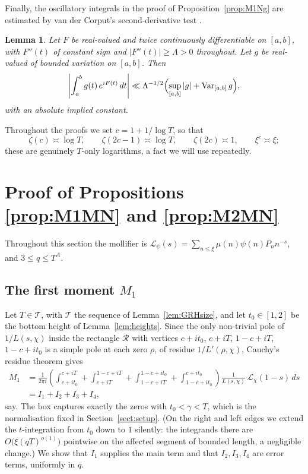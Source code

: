 \documentclass[10pt,a4paper]{amsart}
\newtheorem{lemma}[theorem]{Lemma}
\numberwithin{equation}{section}
\begin{document}
Finally, the oscillatory integrals in the proof of Proposition~\ref{prop:M1Ng} are estimated by van der Corput's second-derivative test \cite[Lemma~4.5]{Titchmarsh}.

\begin{lemma}\label{lem:vdc}
Let $F$ be real-valued and twice continuously differentiable on $[a,b]$, with $F''(t)$ of constant sign and $|F''(t)|\ge\Lambda>0$ throughout. Let $g$ be real-valued of bounded variation on $[a,b]$. Then
\[
\left|\int_a^b g(t)\,e^{iF(t)}\,dt\right|\ll\Lambda^{-1/2}\Bigl(\sup_{[a,b]}|g|+\operatorname{Var}_{[a,b]}g\Bigr),
\]
with an absolute implied constant.
\end{lemma}

Throughout the proofs we set $c=1+1/\log T$, so that
\[
\zeta(c)\asymp\log T,\qquad \zeta(2c-1)\asymp\log T,\qquad \zeta(2c)\asymp1,\qquad \xi^{c}\asymp\xi;
\]
these are genuinely $T$-only logarithms, a fact we will use repeatedly.

\section{Proof of Propositions \ref{prop:M1MN} and \ref{prop:M2MN}}\label{sect:propsMN}

Throughout this section the mollifier is $\mathcal{L}_\psi(s)=\sum_{n\le\xi}\mu(n)\psi(n)P_n n^{-s}$, and $3\le q\le T^{A}$.

\subsection{The first moment $M_1$}
Let $T\in\mathcal T$, with $\mathcal T$ the sequence of Lemma~\ref{lem:GRHsize}, and let $t_0\in[1,2]$ be the bottom height of Lemma~\ref{lem:heights}. Since the only non-trivial pole of $1/L(s,\chi)$ inside the rectangle $\mathcal R$ with vertices $c+it_0$, $c+iT$, $1-c+iT$, $1-c+it_0$ is a simple pole at each zero $\rho$, of residue $1/L'(\rho,\chi)$, Cauchy's residue theorem gives
\[
\begin{aligned}
M_1&=\frac{1}{2\pi i}\left(\int_{c+it_0}^{c+iT}+\int_{c+iT}^{1-c+iT}+\int_{1-c+iT}^{1-c+it_0}+\int_{1-c+it_0}^{c+it_0}\right)\frac{1}{L(s,\chi)}\,\mathcal{L}_{\bar\chi}(1-s)\,ds\\
&=I_1+I_2+I_3+I_4,
\end{aligned}
\]
say. The box captures exactly the zeros with $t_0<\gamma<T$, which is the normalisation fixed in Section~\ref{sect:setup}. (On the right and left edges we extend the $t$-integration from $t_0$ down to $1$ silently: the integrands there are $O\bigl(\xi(qT)^{o(1)}\bigr)$ pointwise on the affected segment of bounded length, a negligible change.) We show that $I_1$ supplies the main term and that $I_2,I_3,I_4$ are error terms, uniformly in $q$.
\end{document}
